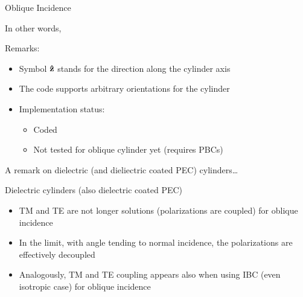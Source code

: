 \begin{frame}[allowframebreaks]{Oblique Incidence}
\begin{block}{In other words,}
      \vbs
      
      Remarks:
      \begin{itemize}
      \item Symbol $\mathbf{\hat{z}}$ stands for the direction along the
        cylinder axis
      \item The code supports arbitrary orientations for the cylinder
      \end{itemize}
    \end{block}

    \begin{itemize}
    \item Implementation status:
      \begin{itemize}
      \item Coded
      \item Not tested for oblique cylinder yet (requires PBCs)
      \end{itemize}
    \end{itemize}
      

    \framebreak %

   \large{A remark on dielectric (and dieliectric coated PEC) cylinders\ldots}
    
   \begin{block}{Dielectric cylinders (also dielectric coated PEC)}
     \begin{itemize}
     \item TM and TE are not longer solutions (\alert{polarizations are
       coupled})  for oblique incidence

   \item In the limit, with angle tending to normal incidence, the
     polarizations are effectively decoupled

   \item Analogously, TM and TE coupling appears also when using IBC (even
     isotropic case) for oblique incidence

     \end{itemize}
   \end{block}

  
\end{frame}
  

